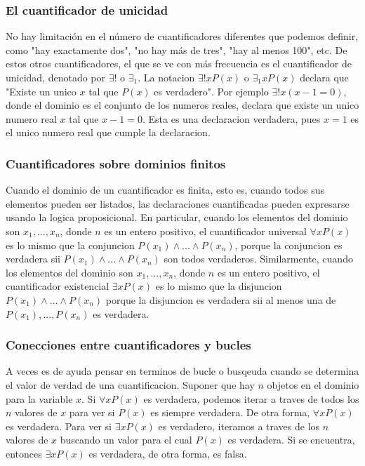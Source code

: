 \documentclass[]{article}
\begin{document}
\subsubsection*{El cuantificador de unicidad}

No hay limitación en el número de cuantificadores diferentes que podemos definir, como "hay exactamente dos", "no hay más de tres", "hay al menos 100", etc. De estos otros cuantificadores, el que se ve con más frecuencia es el cuantificador de unicidad, denotado por $\exists!$ o $\exists_{1}$. La notacion $\exists!xP(x)$ o $\exists_{1}xP(x)$ declara que "Existe un unico $x$ tal que $P(x)$ es verdadero". Por ejemplo $\exists!x(x - 1 = 0)$, donde el dominio es el conjunto de los numeros reales, declara que existe un unico numero real $x$ tal que $x - 1 = 0$. Esta es una declaracion verdadera, pues $x = 1$ es el unico numero real que cumple la declaracion.

\subsubsection*{Cuantificadores sobre dominios finitos}

Cuando el dominio de un cuantificador es finita, esto es, cuando todos sus elementos pueden ser listados, las declaraciones cuantificadas pueden expresarse usando la logica proposicional. En particular, cuando los elementos del dominio son $x_{1}, ..., x_{n}$, donde $n$ es un entero positivo, el cuantificador universal $\forall xP(x)$ es lo mismo que la conjuncion $P(x_{1})\wedge ... \wedge P(x_{n})$, porque la conjuncion es verdadera sii $P(x_{1})\wedge ... \wedge P(x_{n})$ son todos verdaderos.
Similarmente, cuando los elementos del dominio son $x_{1}, ..., x_{n}$, donde $n$ es un entero positivo, el cuantificador existencial $\exists xP(x)$ es lo mismo que la disjuncion $P(x_{1})\wedge ... \wedge P(x_{n})$ porque la disjuncion es verdadera sii al menos una de $P(x_{1}), ..., P(x_{n})$ es verdadera.

\subsubsection*{Conecciones entre cuantificadores y bucles}

A veces es de ayuda pensar en terminos de  bucle o busqeuda cuando se determina el valor de verdad de una cuantificacion. Suponer que hay $n$ objetos en el dominio para la variable $x$. Si $\forall xP(x)$ es verdadera, podemos iterar a traves de todos los $n$ valores de $x$ para ver si $P(x)$ es siempre verdadera. De otra forma, $\forall xP(x)$ es verdadera. Para ver si $\exists xP(x)$ es verdadero, iteramos a traves de los $n$ valores de $x$ buscando un valor para el cual $P(x)$ es verdadera. Si se encuentra, entonces $\exists xP(x)$ es verdadera, de otra forma, es falsa.
\end{document}
